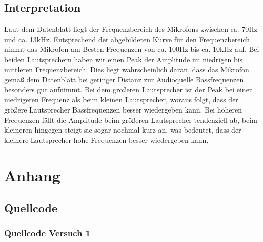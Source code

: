 \documentclass[12pt, oneside, a4paper, \docLanguage]{report}
\begin{document}
\newpage

\section{Interpretation}
\label{chap:VERSUCH_2_INTERPRETATION}
\begin{normalsize}
Laut dem Datenblatt liegt der Frequenzbereich des Mikrofons zwischen ca. 70Hz und ca. 13kHz. Entsprechend der abgebildeten Kurve für den Frequenzbereich nimmt das Mikrofon am Besten Frequenzen von ca. 100Hz bis ca. 10kHz auf.\newline
Bei beiden Lautsprechern haben wir einen Peak der Amplitude
im niedrigen bis mittleren Frequenzbereich. Dies liegt wahrscheinlich daran, dass das Mikrofon gemäß dem Datenblatt bei geringer Distanz zur Audioquelle Bassfrequenzen besonders gut aufnimmt. Bei dem größeren Lautsprecher ist der Peak bei einer niedrigeren Frequenz als beim kleinen Lautsprecher, woraus
folgt, dass der größere Lautsprecher Bassfrequenzen besser wiedergeben kann.\newline
Bei höheren Frequenzen fällt die Amplitude beim größeren Lautsprecher tendenziell ab, beim kleineren hingegen steigt sie sogar nochmal kurz an, was bedeutet, dass der kleinere Lautsprecher hohe Frequenzen besser wiedergeben kann.
\end{normalsize}

%
%
\renewcommand\thesection{A.\arabic{section}}
\renewcommand\thesubsection{\thesection.\arabic{subsection}}

\chapter*{Anhang}
\label{chap:APPENDIX}
\addtocounter{chapter}{1}
\setcounter{section}{0}

\section{Quellcode}
\label{chap:APPENDIX_SOURCECODE}

\subsection{Quellcode Versuch 1}
\label{chap:APPENDIX_SOURCECODE_V1}


\pagebreak
\end{document}

